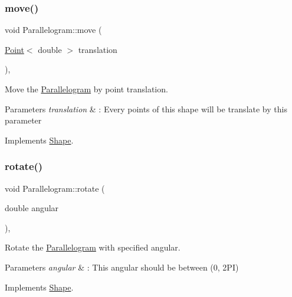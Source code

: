 \subsubsection{\texorpdfstring{move()}{move()}}
{\footnotesize\ttfamily void Parallelogram\+::move (\begin{DoxyParamCaption}\item[{\hyperlink{classPoint}{Point}$<$ double $>$}]{translation }\end{DoxyParamCaption})\hspace{0.3cm}{\ttfamily [override]}, {\ttfamily [virtual]}}



Move the \hyperlink{classParallelogram}{Parallelogram} by point translation. 


\begin{DoxyParams}{Parameters}
{\em translation} & \+: Every points of this shape will be translate by this parameter \\
\hline
\end{DoxyParams}


Implements \hyperlink{classShape_a52649731b2cb7b67315882d5e005f7e8}{Shape}.

\mbox{\label{classParallelogram_ac498f6a15dea236ecc49bece023d17b0}} 
\subsubsection{\texorpdfstring{rotate()}{rotate()}}
{\footnotesize\ttfamily void Parallelogram\+::rotate (\begin{DoxyParamCaption}\item[{double}]{angular }\end{DoxyParamCaption})\hspace{0.3cm}{\ttfamily [override]}, {\ttfamily [virtual]}}



Rotate the \hyperlink{classParallelogram}{Parallelogram} with specified angular. 


\begin{DoxyParams}{Parameters}
{\em angular} & \+: This angular should be between (0, 2\+PI) \\
\hline
\end{DoxyParams}


Implements \hyperlink{classShape_a2dea8616fd40f2d69fd208715921982a}{Shape}.

